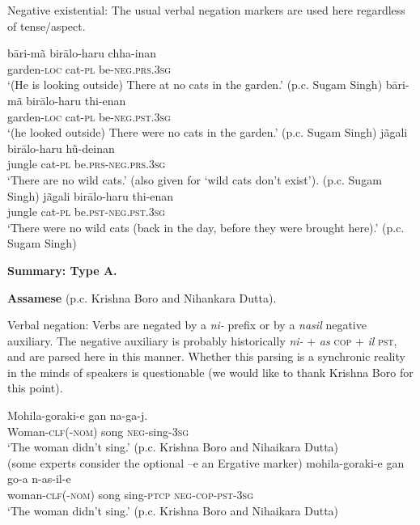 ﻿\documentclass[output=paper]{langsci/langscibook}
\begin{document}
\begin{unindented}
Negative existential: The usual verbal negation markers are used here regardless of tense/aspect.
%
\begin{exe}\ex \gll bāri-mã birālo-haru  chha-inan \\
garden-\textsc{loc} cat-\textsc{pl} be-\textsc{neg.prs.3sg} \\
    \glt `(He is looking outside) There at no cats in the garden.' (p.c. Sugam Singh)
\ex \gll bāri-mã birālo-haru  thi-enan \\
garden-\textsc{loc} cat-\textsc{pl} be-\textsc{neg.pst.3sg} \\
    \glt `(he looked outside) There were no cats in the garden.' (p.c. Sugam Singh)
\ex \gll jãgali birālo-haru hũ-deinan \\
jungle cat-\textsc{pl} be.\textsc{prs-neg.prs.3sg} \\
    \glt `There are no wild cats.' (also given for `wild cats don't exist’). (p.c. Sugam Singh)
\ex \gll jãgali birālo-haru thi-enan \\
jungle cat-\textsc{pl} be.\textsc{pst-neg.pst.3sg} \\
    \glt `There were no wild cats (back in the day, before they were brought here).' (p.c. Sugam Singh)
    \end{exe} 

\textbf{Summary: Type A.}

\textbf{Assamese} (p.c. Krishna Boro and Nihankara Dutta).

Verbal negation: Verbs are negated by a \textit{ni-} prefix or by a
\textit{nasil} negative auxiliary. The negative auxiliary is probably
historically \textit{ni-} + \textit{as} \textsc{cop} + \textit{il}
\textsc{pst}, and are parsed here in this manner. Whether this parsing is a synchronic reality in the minds of speakers is questionable (we would like to thank Krishna Boro for this point).
%
\begin{exe}\ex \gll Mohila-goraki{\op}-e{\cp} gan na-ga-j. \\
Woman-\textsc{clf(-nom)}  song \textsc{neg}-sing-\textsc{3sg} \\
    \glt `The woman didn't sing.' (p.c. Krishna Boro and Nihaikara Dutta)
\\
(some experts consider the optional –e an Ergative marker)
\ex \gll mohila-goraki{\op}-e{\cp} gan  go-a n-as-il-e \\
woman-\textsc{clf}(-\textsc{nom}) song sing-\textsc{ptcp} \textsc{neg-cop-pst-3sg} \\
    \glt `The woman didn't sing.' (p.c. Krishna Boro and Nihaikara Dutta)
    \end{exe}


\end{unindented}
\end{document}
